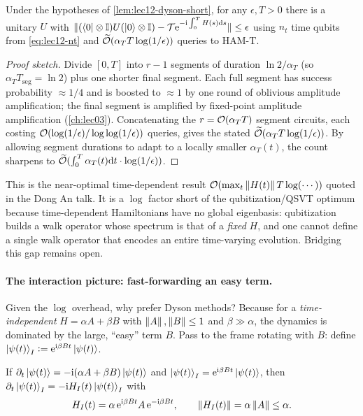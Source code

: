 \begin{theorem}
\label{thm:lec12-dyson-long}
Under the hypotheses of \cref{lem:lec12-dyson-short}, for any $\epsilon,T>0$ there is a
unitary $U$ with
$\|(\bra0\otimes\mathbb{I})U(\ket0\otimes\mathbb{I})-\mathcal T\mathrm{e}^{-\mathrm{i}\int_0^TH(s)\mathrm{d} s}\|\le\epsilon$
using $n_t$ time qubits from \eqref{eq:lec12-nt} and
$\widetilde{\mathcal{O}}(\alpha_T T\log(1/\epsilon))$ queries to $\mathrm{HAM\text{-}T}$.
\end{theorem}

\begin{proof}[Proof sketch]
Divide $[0,T]$ into $r-1$ segments of duration $\ln2/\alpha_T$ (so $\alpha_T T_{\mathrm{seg}}
=\ln2$) plus one shorter final segment. Each full segment has success probability $\approx
1/4$ and is boosted to $\approx1$ by one round of oblivious amplitude amplification; the
final segment is amplified by fixed-point amplitude amplification (\cref{ch:lec03}).
Concatenating the $r=\mathcal{O}(\alpha_T T)$ segment circuits, each costing
$\mathcal{O}(\log(1/\epsilon)/\log\log(1/\epsilon))$ queries, gives the stated
$\widetilde{\mathcal{O}}(\alpha_T T\log(1/\epsilon))$. By allowing segment durations to adapt to a
locally smaller $\alpha_T(t)$, the count sharpens to
$\widetilde{\mathcal{O}}(\int_0^T\alpha_T(t)\mathrm{d} t\cdot\log(1/\epsilon))$.
\end{proof}

This is the near-optimal time-dependent result $\mathcal{O}(\max_t\left\lVert H(t) \right\rVert T\log(\cdots))$
quoted in the Dong An talk. It is a $\log$ factor short of the qubitization/QSVT optimum
because time-dependent Hamiltonians have no global eigenbasis: qubitization builds a walk
operator whose spectrum is that of a \emph{fixed} $H$, and one cannot define a single walk
operator that encodes an entire time-varying evolution. Bridging this gap remains open.

\paragraph{The interaction picture: fast-forwarding an easy term.}
Given the $\log$ overhead, why prefer Dyson methods? Because for a \emph{time-independent}
$H=\alpha A+\beta B$ with $\left\lVert A \right\rVert,\left\lVert B \right\rVert\le1$ and $\beta\gg\alpha$, the dynamics is
dominated by the large, ``easy'' term $B$. Pass to the frame rotating with $B$: define
$\ket{\psi(t)}_I\vcentcolon=\mathrm{e}^{\mathrm{i}\beta Bt}\ket{\psi(t)}$.

\begin{proposition}
\label{prop:lec12-interaction}
If $\partial_t\ket{\psi(t)}=-\mathrm{i}(\alpha A+\beta B)\ket{\psi(t)}$ and
$\ket{\psi(t)}_I=\mathrm{e}^{\mathrm{i}\beta Bt}\ket{\psi(t)}$, then
$\partial_t\ket{\psi(t)}_I=-\mathrm{i} H_I(t)\ket{\psi(t)}_I$ with
\begin{equation}
  H_I(t)=\alpha\,\mathrm{e}^{\mathrm{i}\beta Bt}A\,\mathrm{e}^{-\mathrm{i}\beta Bt},
  \qquad
  \left\lVert H_I(t) \right\rVert=\alpha\left\lVert A \right\rVert\le\alpha.
  \label{eq:lec12-interaction}
\end{equation}
\end{proposition}

